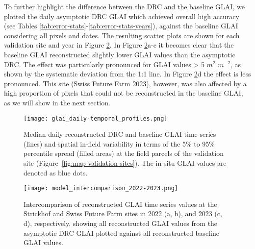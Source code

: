 To further highlight the difference between the \gls{DRC} and the baseline \gls{GLAI}, we plotted the daily asymptotic \gls{DRC} \gls{GLAI} which achieved overall high accuracy (see Tables \ref{tab:error-stats}-\ref{tab:error-stats-years}), against the baseline \gls{GLAI} considering all pixels and dates. The resulting scatter plots are shown for each validation site and year in Figure \ref{fig:model-intercomparison}. In Figure \ref{fig:model-intercomparison}a-c it becomes clear that the baseline \gls{GLAI} reconstructed slightly lower \gls{GLAI} values than the asymptotic \gls{DRC}. The effect was particularly pronounced for GLAI values > 5 $m^2$ $m^{-2}$, as shown by the systematic deviation from the 1:1 line. In Figure \ref{fig:model-intercomparison}d the effect is less pronounced. This site (Swiss Future Farm 2023), however, was also affected by a high proportion of pixels that could not be reconstructed in the baseline \gls{GLAI}, as we will show in the next section.

\begin{figure}[H]
    \centering
    \texttt{[image: glai\_daily-temporal\_profiles.png]}
    \caption{Median daily reconstructed \gls{DRC} and baseline \gls{GLAI} time series (lines) and spatial in-field variability in terms of the 5\% to 95\% percentile spread (filled areas) at the field parcels of the validation site (Figure~\ref{fig:map-validation-sites}). The in-situ \gls{GLAI} values are denoted as blue dots.}
    \label{fig:glai-trajectories}
\end{figure}

\begin{figure}[H]
    \centering
    \texttt{[image: model\_intercomparison\_2022-2023.png]}
    \caption{Intercomparison of reconstructed GLAI time series values at the Strickhof and Swiss Future Farm sites in 2022 (a, b), and 2023 (c, d), respectively, showing all reconstructed GLAI values from the asymptotic DRC GLAI plotted against all reconstructed baseline GLAI values.}
    \label{fig:model-intercomparison}
\end{figure}


